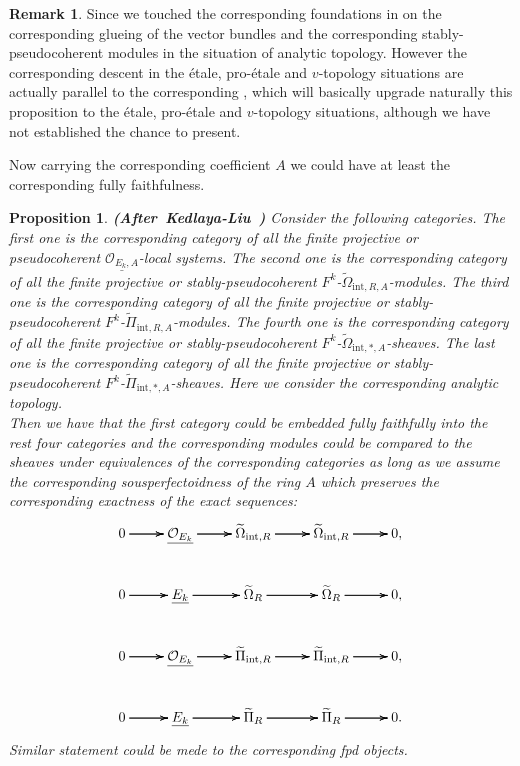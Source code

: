 \documentclass[12pt]{amsart}
\newtheorem{proposition}[theorem]{Proposition}
\theoremstyle{definition}
\newtheorem{remark}[theorem]{Remark}
\numberwithin{equation}{section}
\begin{document}
\begin{remark}
Since we touched the corresponding foundations in \cite[Theorem 1.4.2, Theorem 1.4.18]{Ked1} on the corresponding glueing of the vector bundles and the corresponding stably-pseudocoherent modules in the situation of analytic topology. However the corresponding descent in the \'etale, pro-\'etale and $v$-topology situations are actually parallel to the corresponding \cite[Theorem 2.5.5, Theorem 2.5.14, Theorem 3.4.8, Theorem 3.5.8]{KL2}, which will basically upgrade naturally this proposition to the \'etale, pro-\'etale and $v$-topology situations, although we have not established the chance to present. 
\end{remark}



\indent Now carrying the corresponding coefficient $A$ we could have at least the corresponding fully faithfulness. 


\begin{proposition}\mbox{\bf{(After Kedlaya-Liu \cite[Theorem 4.5.7]{KL2})}}
Consider the following categories. The first one is the corresponding category of all the finite projective or pseudocoherent $\underline{\mathcal{O}_{{E_k},A}}$-local systems. The second one is the corresponding category of all the finite projective or stably-pseudocoherent $F^k$-$\widetilde{\Omega}_{\mathrm{int},R,A}$-modules. The third one is the corresponding category of all the finite projective or stably-pseudocoherent $F^k$-$\widetilde{\Pi}_{\mathrm{int},R,A}$-modules. The fourth one is the corresponding category of all the finite projective or stably-pseudocoherent $F^k$-$\widetilde{\Omega}_{\mathrm{int},*,A}$-sheaves. The last one is the corresponding category of all the finite projective or stably-pseudocoherent $F^k$-$\widetilde{\Pi}_{\mathrm{int},*,A}$-sheaves. Here we consider the corresponding analytic topology. \\
\indent Then we have that the first category could be embedded fully faithfully into the rest four categories and the corresponding modules could be compared to the sheaves under equivalences of the corresponding categories as long as we assume the corresponding sousperfectoidness of the ring $A$ which preserves the corresponding exactness of the exact sequences:
\[
\xymatrix@C+0pc@R+0pc{
0 \ar[r] \ar[r] \ar[r] &\underline{\mathcal{O}_{E_k}}  \ar[r] \ar[r] \ar[r] &\widetilde{\Omega}_{\mathrm{int},R} \ar[r] \ar[r] \ar[r] &\widetilde{\Omega}_{\mathrm{int},R} \ar[r] \ar[r] \ar[r] &0,\\
0 \ar[r] \ar[r] \ar[r] &\underline{{E}_{k}}  \ar[r] \ar[r] \ar[r] &\widetilde{\Omega}_{R} \ar[r] \ar[r] \ar[r] &\widetilde{\Omega}_{R} \ar[r] \ar[r] \ar[r] &0,\\
0 \ar[r] \ar[r] \ar[r] &\underline{\mathcal{O}_{E_k}}  \ar[r] \ar[r] \ar[r] &\widetilde{\Pi}_{\mathrm{int},R} \ar[r] \ar[r] \ar[r] &\widetilde{\Pi}_{\mathrm{int},R} \ar[r] \ar[r] \ar[r] &0,\\
0 \ar[r] \ar[r] \ar[r] &\underline{{E_k}}  \ar[r] \ar[r] \ar[r] &\widetilde{\Pi}_{R} \ar[r] \ar[r] \ar[r] &\widetilde{\Pi}_{R} \ar[r] \ar[r] \ar[r] &0.\\
}
\]	
Similar statement could be mede to the corresponding fpd objects.	
\end{proposition}
\end{document}
